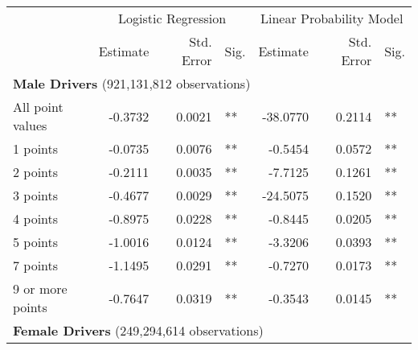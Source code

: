 
\begin{table}%
\centering 
\begin{tabular}{l r r l r r l} 

\hline 
 
 & \multicolumn{3}{c}{Logistic Regression}  & \multicolumn{3}{c}{Linear Probability Model} \\ 

 \cmidrule(lr){2-4}\cmidrule(lr){5-7} 
 & Estimate & Std. Error & Sig. & Estimate & Std. Error & Sig. \\ 

\hline 
 
\multicolumn{7}{l}{\textbf{Male Drivers} (921,131,812 observations)} \\ 

All point values                &  -0.3732        &  0.0021       &   **       &  -38.0770        &  0.2114       &   **       \\ 
1 points                        &  -0.0735        &  0.0076       &   **       &  -0.5454        &  0.0572       &   **       \\ 
2 points                        &  -0.2111        &  0.0035       &   **       &  -7.7125        &  0.1261       &   **       \\ 
3 points                        &  -0.4677        &  0.0029       &   **       &  -24.5075        &  0.1520       &   **       \\ 
4 points                        &  -0.8975        &  0.0228       &   **       &  -0.8445        &  0.0205       &   **       \\ 
5 points                        &  -1.0016        &  0.0124       &   **       &  -3.3206        &  0.0393       &   **       \\ 
7 points                        &  -1.1495        &  0.0291       &   **       &  -0.7270        &  0.0173       &   **       \\ 
9 or more points                &  -0.7647        &  0.0319       &   **       &  -0.3543        &  0.0145       &   **       \\ 

\hline 

\multicolumn{7}{l}{\textbf{Female Drivers} (249,294,614 observations)} \\ 


\end{tabular}
\end{table}
